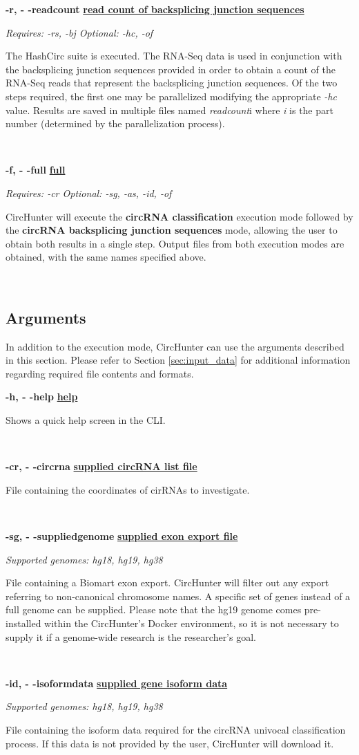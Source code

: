 \documentclass[letterpaper,12pt]{article}
\newcommand{\entry}[4]{
  \begin{minipage}[t]{.05\textwidth}
  \end{minipage}
  \hfill\vline\hfill
  \begin{minipage}[t]{.90\textwidth}
    {\bfseries#1} {\hfill\underline{\bfseries#2}}
    
    \textit{#3}
    
    {#4}
  \end{minipage}\\\vspace{.25cm}}
\begin{document}
\entry
{-r, - -readcount}
{read count of backsplicing junction sequences}
{Requires: -rs, -bj \hspace{0.25in} Optional: -hc, -of}
{The HashCirc suite is executed. The RNA-Seq data is used in conjunction with the backsplicing junction sequences provided in order to obtain a count of the RNA-Seq reads that represent the backsplicing junction sequences. Of the two steps required, the first one may be parallelized modifying the appropriate \textit{-hc} value. Results are saved in multiple files named \textit{readcount}i where \textit{i} is the part number (determined by the parallelization process).}

\entry
{-f, - -full}
{full}
{Requires: -cr \hspace{0.25in}Optional: -sg, -as, -id, -of}
{CircHunter will execute the \textbf{circRNA classification} execution mode followed by the \textbf{circRNA backsplicing junction sequences} mode, allowing the user to obtain both results in a single step. Output files from both execution modes are obtained, with the same names specified above.}

\subsection{Arguments}

In addition to the execution mode, CircHunter can use the arguments described in this section. Please refer to Section \ref{sec:input_data} for additional information regarding required file contents and formats.

\vspace{0.25in}

\entry
{-h, - -help}
{help}
{}
{Shows a quick help screen in the CLI.}


\entry
{-cr, - -circrna}
{supplied circRNA list file}
{}
{File containing the coordinates of cirRNAs to investigate.}

\entry
{-sg, - -suppliedgenome}
{supplied exon export file}
{Supported genomes: hg18, hg19, hg38}
{File containing a Biomart exon export. CircHunter will filter out any export referring to non-canonical chromosome names. A specific set of genes instead of a full genome can be supplied. Please note that the hg19 genome comes pre-installed within the CircHunter's Docker environment, so it is not necessary to supply it if a genome-wide research is the researcher's goal.}

\entry
{-id, - -isoformdata}
{supplied gene isoform data}
{Supported genomes: hg18, hg19, hg38}
{File containing the isoform data required for the circRNA univocal classification process. If this data is not provided by the user, CircHunter will download it.}
\end{document}
